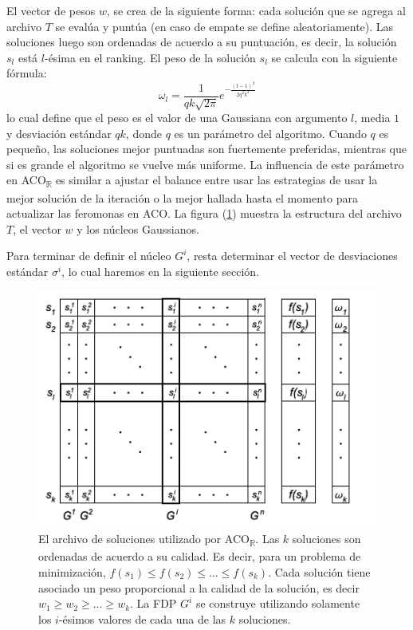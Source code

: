 \documentclass{llncs}
\begin{document}
	El vector de pesos $w$, se crea de la siguiente forma: cada solución que se agrega al archivo $T$ se evalúa y puntúa (en caso de
	empate se define aleatoriamente). Las soluciones luego son ordenadas de acuerdo a su puntuación, es decir, la solución $s_l$ está
	$l$-ésima en el ranking. El peso de la solución $s_l$ se calcula con la siguiente fórmula:
	\begin{equation}
	\label{eq:vectorPesos}
	\omega_l = \frac{1}{qk\sqrt{2\pi}}e^{-\frac{(l-1)^2}{2q^2k^2}}
	\end{equation}
	lo cual define que el peso es el valor de una Gaussiana con argumento $l$, media $1$ y desviación estándar $qk$, donde $q$ es
	un parámetro del algoritmo. Cuando $q$ es pequeño, las soluciones mejor puntuadas son fuertemente preferidas, mientras que si es
	grande el algoritmo se vuelve más uniforme. La influencia de este parámetro en ACO\textsubscript{$\mathbb{R}$} es similar a ajustar el balance entre
	usar las estrategias de usar la mejor solución de la iteración o la mejor hallada hasta el momento para actualizar las feromonas en
	ACO. La figura (\ref{fig:archivo}) muestra la estructura del archivo $T$, el vector $w$ y los núcleos Gaussianos.
	
	Para terminar de definir el núcleo $G^i$, resta determinar el vector de desviaciones estándar $\sigma^i$, lo cual haremos en la siguiente
	sección.
	
	\begin{figure}[H]
		\centering
		\includegraphics[scale=0.5]{archive.png}
		\caption{El archivo de soluciones utilizado por ACO\textsubscript{$\mathbb{R}$}. Las $k$ soluciones son ordenadas de acuerdo a su calidad.
		Es decir, para un problema de minimización, $f(s_1) \leq f(s_2) \leq \dots \leq f(s_k)$. Cada solución tiene asociado un peso
		proporcional a la calidad de la solución, es decir $w_1 \geq w_2 \geq \dots \geq w_k$. La FDP $G^i$ se construye utilizando solamente
		los $i$-ésimos valores de cada una de las $k$ soluciones.}
		\label{fig:archivo}
	\end{figure}
	
\end{document}
